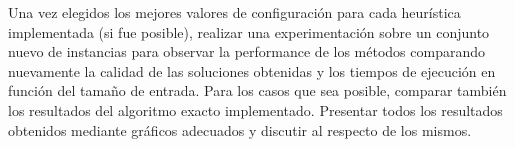 Una vez elegidos los mejores valores de configuración para cada heurística implementada (si fue
posible), realizar una experimentación sobre un conjunto nuevo de instancias para observar
la performance de los métodos comparando nuevamente la calidad de las soluciones obtenidas y los
tiempos de ejecución en función del tamaño de entrada. Para los casos que sea posible, comparar
también los resultados del algoritmo exacto implementado. Presentar todos los resultados obtenidos
mediante gráficos adecuados y discutir al respecto de los mismos.